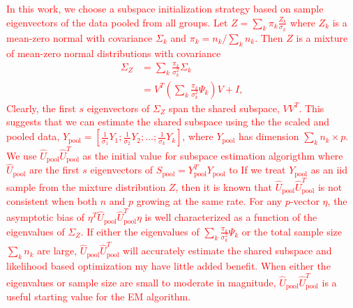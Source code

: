 \documentclass{statsoc}
\newcommand{\edits}[1]{{\textsf{\textcolor{red}{#1}}}}
\begin{document}
\edits{In this work, we choose a subspace initialization strategy
  based on sample eigenvectors of the data pooled from all groups.    Let
  $ Z = \sum_k \pi_k \frac{Z_k}{\sigma_k}$ where $Z_k$ is a mean-zero
  normal with covariance $\Sigma_k$ and $\pi_k = n_k / \sum_k
  n_k$. Then $Z$ is a
  mixture of mean-zero normal distributions with covariance 
  \begin{align*}
\Sigma_Z &= \sum_k \frac{\pi_k}{\sigma^2_k} \Sigma_k\\
  &= V^T( \sum_k \frac{\pi_k}{\sigma_k^2} \Psi_k)V + I,
  \end{align*} Clearly, the first $s$
  eigenvectors of $\Sigma_Z$ span the shared subspace, $VV^T$.  This suggests
  that we can estimate the shared subspace using the the scaled and pooled
  data, $Y_{\text{pool}} = [\frac{1}{\sigma_1}Y_1;
  \frac{1}{\sigma_2}Y_2;...;  \frac{1}{\sigma_k}Y_k]$, where
  $Y_{\text{pool}}$ has dimension $\sum_k n_k \times p$.  
  We use $\hat{U}_{\text{pool}}\hat{U}_{\text{pool}}^T$  as the
  initial value for subspace estimation algorigthm where 
  $\hat{U}_{\text{pool}}$ are the first $s$ eigenvectors of
  $S_{\text{pool}} = Y_{\text{pool}}^TY_{\text{pool}}$ to
  If we
  treat $Y_{\text{pool}}$ as an iid sample from the mixture
  distribution $Z$,  then it is known that  $\hat{U}_{\text{pool}}\hat{U}_{\text{pool}}^T$ is not
  consistent when both $n$ and $p$ growing at the same rate.}
\edits{For any $p$-vector $\eta$, the asymptotic bias of
  $\eta^T\hat{U}_{\text{pool}}\hat{U}_{\text{pool}}^T\eta$ is well characterized as a function of the eigenvalues of $\Sigma_Z$\citep{Mestre2008}.  If either the eigenvalues of $\sum_k
  \frac{\pi_k}{\sigma_k^2} \Psi_k$ or the total sample size $\sum_k n_k$
  are large, $\hat{U}_{\text{pool}}\hat{U}_{\text{pool}}^T$ will
  accurately estimate the shared subspace and likelihood based
  optimization my have little added benefit.  When either the eigenvalues
  or sample size are small to moderate in magnitude,
  $\hat{U}_{\text{pool}}\hat{U}_{\text{pool}}^T$ is a useful starting value for the EM algorithm.}






\end{document}
